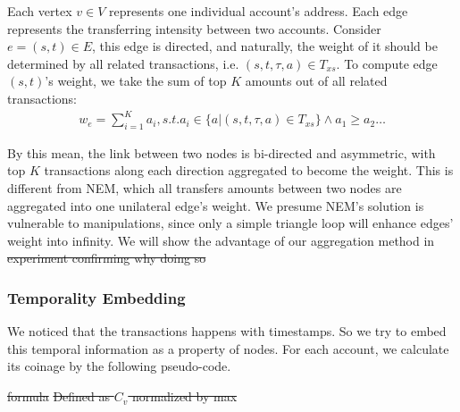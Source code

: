 Each vertex $v \in V$ represents one individual account's address. Each edge represents the transferring intensity between two accounts. Consider $e=(s,t) \in E$, this edge is directed, and naturally, the weight of it should be determined by all related transactions, i.e. $(s,t,\tau, a) \in T_{xs}$. To compute edge $(s,t)$'s weight, we take the sum of top $K$ amounts out of all related transactions:
\begin{align}
w_e = \sum_{i=1}^K a_i, s.t. a_i \in \{a|(s,t,\tau,a) \in T_{xs} \} \land a_1 \geq a_2 \dots
\end{align}

By this mean, the link between two nodes is bi-directed and asymmetric, with top $K$ transactions along each direction aggregated to become the weight. This is different from NEM, which all transfers amounts between two nodes are aggregated into one unilateral edge's weight\cite{nem}. We presume NEM's solution is vulnerable to manipulations, since only a simple triangle loop will enhance edges' weight into infinity. We will show the advantage of our aggregation method in  \st{experiment confirming why doing so}

\subsubsection{Temporality Embedding} \label{subsec:coinage}
We noticed that the transactions happens with timestamps. So we try to embed this temporal information as a property of nodes. For each account, we calculate its coinage by the following pseudo-code. 

\st{formula} \st{Defined as $C_v$ normalized by max}

